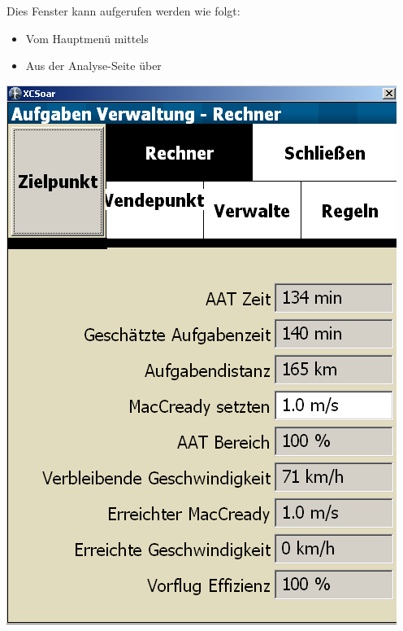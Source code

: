 Dies Fenster kann aufgerufen werden wie folgt:
\begin{itemize}
\item Vom Hauptmenü mittels
\begin{quote}
\blink{}\blink {}
\end{quote}
\item Aus der Analyse-Seite über \blink{}\blink{}
\end{itemize}

\begin{center}
\includegraphics[angle=0,width=0.65\linewidth,keepaspectratio='true']{figures/dialog-taskcalc3.png}
\end{center}

